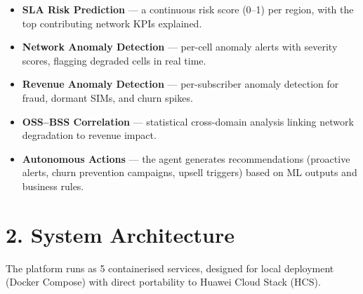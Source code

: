 \documentclass[12pt,a4paper]{article}
\begin{document}
\begin{itemize}[nosep,leftmargin=1.2em]
  \item \textbf{SLA Risk Prediction} — a continuous risk score (0--1) per region, with the top contributing network KPIs explained.
  \item \textbf{Network Anomaly Detection} — per-cell anomaly alerts with severity scores, flagging degraded cells in real time.
  \item \textbf{Revenue Anomaly Detection} — per-subscriber anomaly detection for fraud, dormant SIMs, and churn spikes.
  \item \textbf{OSS--BSS Correlation} — statistical cross-domain analysis linking network degradation to revenue impact.
  \item \textbf{Autonomous Actions} — the agent generates recommendations (proactive alerts, churn prevention campaigns, upsell triggers) based on ML outputs and business rules.
\end{itemize}

\section*{2. System Architecture}

The platform runs as 5 containerised services, designed for local deployment (Docker Compose) with direct portability to Huawei Cloud Stack (HCS).
\end{document}

